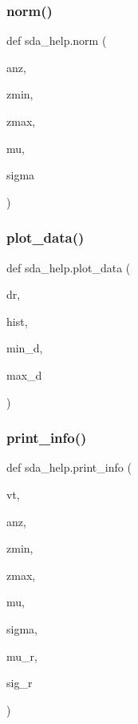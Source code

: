 \mbox{\label{namespacesda__help_a9fe933819134c7074756554aa536bf5a}} 
\subsubsection{\texorpdfstring{norm()}{norm()}}
{\footnotesize\ttfamily def sda\+\_\+help.\+norm (\begin{DoxyParamCaption}\item[{}]{anz,  }\item[{}]{zmin,  }\item[{}]{zmax,  }\item[{}]{mu,  }\item[{}]{sigma }\end{DoxyParamCaption})}

\mbox{\label{namespacesda__help_aa4f0c4955e359bd07e5b6846f1edfc7e}} 
\subsubsection{\texorpdfstring{plot\+\_\+data()}{plot\_data()}}
{\footnotesize\ttfamily def sda\+\_\+help.\+plot\+\_\+data (\begin{DoxyParamCaption}\item[{}]{dr,  }\item[{}]{hist,  }\item[{}]{min\+\_\+d,  }\item[{}]{max\+\_\+d }\end{DoxyParamCaption})}

\mbox{\label{namespacesda__help_a22c6c611e5f3067e66857ed22325e6fd}} 
\subsubsection{\texorpdfstring{print\+\_\+info()}{print\_info()}}
{\footnotesize\ttfamily def sda\+\_\+help.\+print\+\_\+info (\begin{DoxyParamCaption}\item[{}]{vt,  }\item[{}]{anz,  }\item[{}]{zmin,  }\item[{}]{zmax,  }\item[{}]{mu,  }\item[{}]{sigma,  }\item[{}]{mu\+\_\+r,  }\item[{}]{sig\+\_\+r }\end{DoxyParamCaption})}

